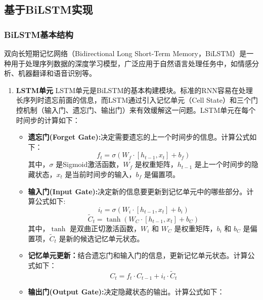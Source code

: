 \subsection{基于BiLSTM实现}
\subsubsection{BiLSTM基本结构}
双向长短期记忆网络（Bidirectional Long Short-Term Memory，BiLSTM）是一种用于处理序列数据的深度学习模型，广泛应用于自然语言处理任务中，如情感分析、机器翻译和语音识别等。
\begin{enumerate}
    \item \textbf{LSTM单元}\newline
    LSTM单元是BiLSTM的基本构建模块。标准的RNN容易在处理长序列时遗忘前面的信息，而LSTM通过引入记忆单元（Cell State）和三个门控机制（输入门、遗忘门、输出门）来有效缓解这一问题。LSTM单元在每个时间步的计算如下：
    \begin{itemize}
        \item \textbf{遗忘门(Forget Gate):}决定需要遗忘的上一个时间步的信息。计算公式如下：\newline
        \begin{equation}
            f_t = \sigma(W_f \cdot [h_{t-1}, x_t] + b_f)
        \end{equation}
        其中，$\sigma$ 是Sigmoid激活函数，$W_f$ 是权重矩阵，$h_{t-1}$ 是上一个时间步的隐藏状态，$x_t$ 是当前时间步的输入，$b_f$ 是偏置项。
        \item \textbf{输入门(Input Gate):}决定新的信息要更新到记忆单元中的哪些部分。计算公式如下:
        \begin{equation}
            i_t = \sigma(W_i \cdot [h_{t-1}, x_t] + b_i)
        \end{equation}
        \begin{equation}
            \tilde{C}_t = \tanh(W_C \cdot [h_{t-1}, x_t] + b_C)
        \end{equation}
其中，$\tanh$ 是双曲正切激活函数，$W_i$ 和 $W_C$ 是权重矩阵，$b_i$ 和 $b_C$ 是偏置项，$\tilde{C}_t$ 是新的候选记忆单元状态。
        \item \textbf{记忆单元更新：}结合遗忘门和输入门的信息，更新记忆单元状态。计算公式如下：
        \begin{equation}
            C_t = f_t \cdot C_{t-1} + i_t \cdot \tilde{C}_t
        \end{equation}
        \item \textbf{输出门(Output Gate):}决定隐藏状态的输出。计算公式如下：
        \begin{equation}

\end{equation}
\end{itemize}
\end{enumerate}
